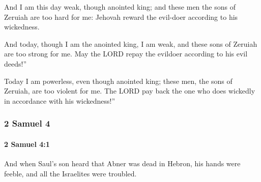 			\begin{versebox}
					\item[BHS] 
					\item[ASV] And I am this day weak, though anointed king; and these men the sons of Zeruiah are too hard for me: Jehovah reward the evil-doer according to his wickedness.
					\item[NIV] And today, though I am the anointed king, I am weak, and these sons of Zeruiah are too strong for me. May the LORD repay the evildoer according to his evil deeds!”
					\item[NRSV] Today I am powerless, even though anointed king; these men, the sons of Zeruiah, are too violent for me. The LORD pay back the one who does wickedly in accordance with his wickedness!”
			\end{versebox}
	\subsubsection{2 Samuel 4} %
		\label{2SAMUEL-4}

		\paragraph{2 Samuel 4:1} %
			\label{2SAMUEL-4-1}

			And when Saul’s son heard that Abner was dead in Hebron, his hands were feeble, and all the Israelites were troubled.

